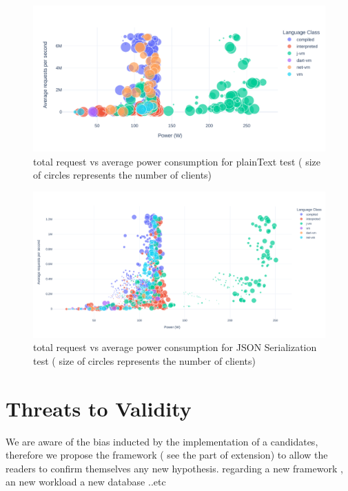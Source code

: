 \begin{figure}[bht]
    \centering
    \includegraphics[width=
        \columnwidth]{imgs/power_requests_plaintext}
    \caption{total request vs average power consumption for plainText test ( size of circles represents the number of clients)}
    \label{fig:power_requests_plaintext}
\end{figure}
\begin{figure}[bht]
    \centering
    \includegraphics[width=
        \columnwidth]{imgs/power_requests_json}
    \caption{total request vs average power consumption for JSON Serialization test ( size of circles represents the number of clients)}
    \label{fig:power_requests_json}
\end{figure}





\section{Threats to Validity}
We are aware of the bias inducted by the implementation of a candidates, therefore we propose  the framework ( see the part of extension) to allow the readers to confirm themselves any new hypothesis. regarding a new framework , an new workload a new database ..etc

